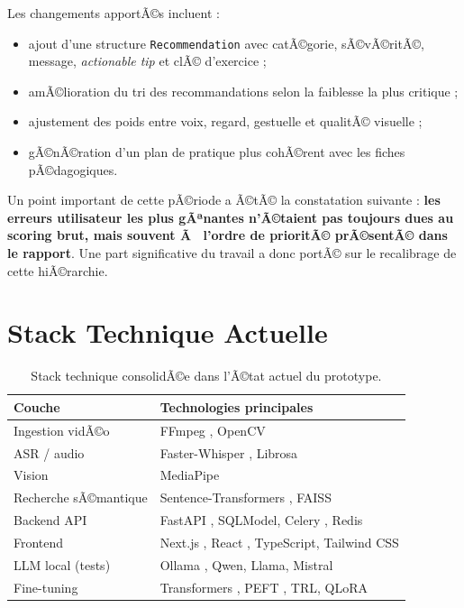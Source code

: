 ﻿\documentclass[12pt,a4paper]{article}
\begin{document}
Les changements apportÃ©s incluent :
\begin{itemize}
    \item ajout d'une structure \texttt{Recommendation} avec catÃ©gorie, sÃ©vÃ©ritÃ©, message, \textit{actionable tip} et clÃ© d'exercice ;
    \item amÃ©lioration du tri des recommandations selon la faiblesse la plus critique ;
    \item ajustement des poids entre voix, regard, gestuelle et qualitÃ© visuelle ;
    \item gÃ©nÃ©ration d'un plan de pratique plus cohÃ©rent avec les fiches pÃ©dagogiques.
\end{itemize}

Un point important de cette pÃ©riode a Ã©tÃ© la constatation suivante : \textbf{les erreurs utilisateur les plus gÃªnantes n'Ã©taient pas toujours dues au scoring brut, mais souvent Ã  l'ordre de prioritÃ© prÃ©sentÃ© dans le rapport}. Une part significative du travail a donc portÃ© sur le recalibrage de cette hiÃ©rarchie.

\section{Stack Technique Actuelle}
\begin{table}[H]
    \centering
    \begin{tabular}{@{}ll@{}}
        \toprule
        \textbf{Couche} & \textbf{Technologies principales} \\
        \midrule
        Ingestion vidÃ©o & FFmpeg \cite{ffmpeg}, OpenCV \cite{opencv_library} \\
        ASR / audio & Faster-Whisper \cite{radford2022robust,ctranslate2}, Librosa \cite{mcfee2015librosa} \\
        Vision & MediaPipe \cite{mediapipe2023} \\
        Recherche sÃ©mantique & Sentence-Transformers \cite{reimers-2019-sentence-bert}, FAISS \cite{johnson2019billion} \\
        Backend API & FastAPI \cite{fastapi}, SQLModel, Celery \cite{celery}, Redis \\
        Frontend & Next.js \cite{nextjs}, React \cite{react}, TypeScript, Tailwind CSS \\
        LLM local (tests) & Ollama \cite{ollama}, Qwen, Llama, Mistral \\
        Fine-tuning & Transformers \cite{transformers}, PEFT \cite{peft}, TRL, QLoRA \cite{qlora} \\
        \bottomrule
    \end{tabular}
    \caption{Stack technique consolidÃ©e dans l'Ã©tat actuel du prototype.}
\end{table}
\end{document}

